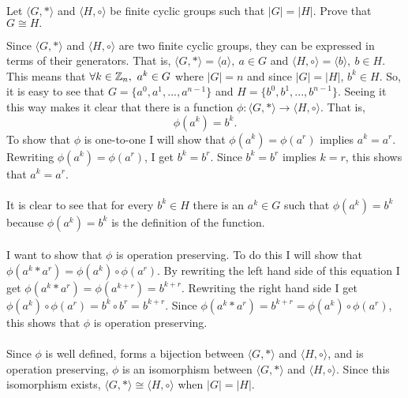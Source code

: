 \documentclass[titlepage]{article}
\begin{document}
\begin{problem}{3}
Let $\langle G, * \rangle $ and $\langle H, \circ \rangle$ be finite cyclic groups such that $|G| = |H|$. Prove that $G \cong H.$
\end{problem}
\begin{myproof}
Since $\langle G, * \rangle$ and $\langle H, \circ \rangle $ are two finite cyclic groups, they can be expressed in terms of their generators. That is, $\langle G, * \rangle = \langle a \rangle , \ a \in G$ and $\langle H, \circ \rangle = \langle b \rangle , \ b \in H$. This means that $\forall k \in \mathbb{Z}_n, \ a^k \in G$ where $|G|=n$ and since $|G| = |H|$, $b^k \in H$. So, it is easy to see that $G = \{a^0, a^1, ... , a^{n-1}\}$ and $H = \{b^0, b^1, ... , b^{n-1}\}$. Seeing it this way makes it clear that there is a function $\phi: \langle G, *\rangle \rightarrow \langle H, \circ \rangle$. That is, $$\phi(a^k) = b^k.$$
To show that $\phi$ is one-to-one I will show that $\phi(a^k) = \phi(a^r)$ implies $a^k = a^r$. Rewriting $\phi(a^k) = \phi(a^r)$, I get $b^k = b^r$. Since $b^k = b^r$ implies $k=r$, this shows that $a^k = a^r$.
\\ \\
It is clear to see that for every $b^k \in H$ there is an $a^k \in G$ such that $\phi(a^k) = b^k$ because $\phi(a^k) = b^k$ is the definition of the function.
\\ \\
I want to show that $\phi$ is operation preserving. To do this I will show that $\phi(a^k * a^r) = \phi(a^k) \circ \phi(a^r)$. By rewriting the left hand side of this equation I get $\phi(a^k * a^r) = \phi(a^{k+r}) = b^{k+r}$. Rewriting the right hand side I get $\phi(a^k) \circ \phi(a^r) = b^k \circ b^r = b^{k+r}$. Since $\phi(a^k * a^r)= b^{k+r} = \phi(a^k) \circ \phi(a^r)$, this shows that $\phi$ is operation preserving.
\\ \\
Since $\phi$ is well defined, forms a bijection between $\langle G,* \rangle$ and $\langle H, \circ \rangle$, and is operation preserving, $\phi$ is an isomorphism between  $\langle G,* \rangle$ and $\langle H, \circ \rangle$. Since this isomorphism exists,  $\langle G,* \rangle \cong \langle H, \circ \rangle$ when $|G| = |H|$.
\end{myproof}
\end{document}

